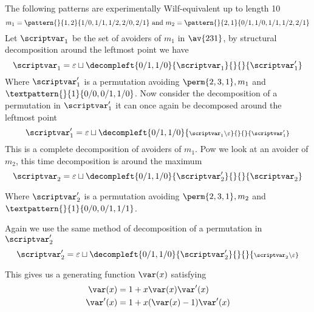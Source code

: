 \subsection{}
\nextvar
The following patterns are experimentally Wilf-equivalent up to length 10
\begin{equation*}
    m_1 = \pattern{}{1,2}{1/0,1/1,1/2,2/0,2/1} \text{ and }
    m_2 = \pattern{}{2,1}{0/1,1/0,1/1,1/2,2/1}
\end{equation*}
Let \(\scriptvar_1\) be the set of avoiders of \(m_1\) in \(\av{231}\), by structural decomposition
around the leftmost point we have
\begin{equation*}
    \scriptvar_1 = \varepsilon \sqcup
    \decompleft{0/1,1/0}{\scriptvar_1}{}{}{\scriptvar^\prime_1}
\end{equation*}
Where \(\scriptvar^\prime_1\) is a permutation avoiding \(\perm{2,3,1}, m_1\)
and \(\textpattern{}{1}{0/0,0/1,1/0}\).
Now consider the decomposition of a permutation in \(\scriptvar^\prime_1\) it can
once again be decomposed around the leftmost point
\begin{equation*}
    \scriptvar^\prime_1 = \varepsilon \sqcup
    \decompleft{0/1,1/0}{\scriptstyle \scriptvar_1\setminus\varepsilon}{}{}{\scriptvar^\prime_1}
\end{equation*}
This is a complete decomposition of avoiders of \(m_1\). Pow we
look at an avoider of \(m_2\), this time decomposition is around the maximum
\begin{equation*}
    \scriptvar_2 = \varepsilon \sqcup
    \decompleft{0/1,1/0}{\scriptvar^\prime_2}{}{}{\scriptvar_2}
\end{equation*}

Where \(\scriptvar^\prime_2\) is a permutation avoiding \(\perm{2,3,1}, m_2\)
and \(\textpattern{}{1}{0/0,0/1,1/1}\).

Again we use the same method of decomposition of a permutation in \(\scriptvar^\prime_2\)
\begin{equation*}
    \scriptvar^\prime_2 = \varepsilon \sqcup
    \decompleft{0/1,1/0}{\scriptvar^\prime_2}{}{}{\scriptstyle \scriptvar_2\setminus\varepsilon}
\end{equation*}

This gives us a generating function \(\var(x)\) satisfying
\begin{align}
    \var(x) &= 1 + x\var(x)\var^\prime(x) \label{eqn:Pgen}\\
    \var^\prime(x) &= 1 + x(\var(x)-1)\var^\prime(x)\label{eqn:PprimeGen}
\end{align}

